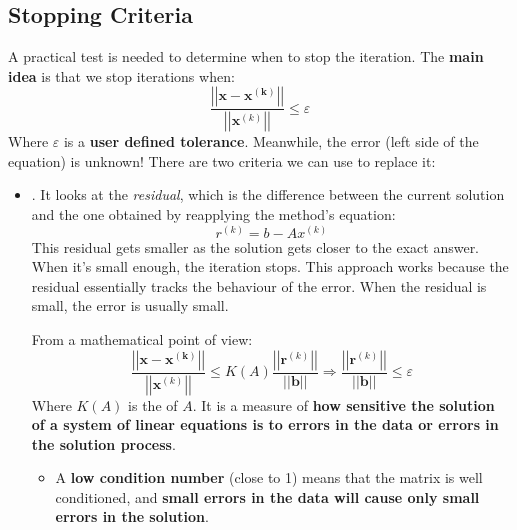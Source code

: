 \subsection{Stopping Criteria}

A practical test is needed to determine when to stop the iteration. The \textbf{main idea} is that we stop iterations when:
\begin{equation*}
    \dfrac{\left|\left|\mathbf{x} - \mathbf{x^{\left(k\right)}}\right|\right|}{\left|\left|\mathbf{x}^{\left(k\right)}\right|\right|} \le \varepsilon
\end{equation*}
Where $\varepsilon$ is a \textbf{user defined tolerance}. Meanwhile, the error (left side of the equation) is unknown! There are two criteria we can use to replace it:
\begin{itemize}
    \item {}. It looks at the \emph{residual}, which is the difference between the current solution and the one obtained by reapplying the method's equation:
    \begin{equation*}
        r^{\left(k\right)} = b - Ax^{\left(k\right)}
    \end{equation*}
    This residual gets smaller as the solution gets closer to the exact answer. When it's small enough, the iteration stops. This approach works because the residual essentially tracks the behaviour of the error. When the residual is small, the error is usually small.
    
    From a mathematical point of view:
    \begin{equation*}
        \dfrac{\left|\left|\mathbf{x} - \mathbf{x^{\left(k\right)}}\right|\right|}{\left|\left|\mathbf{x}^{\left(k\right)}\right|\right|} \le K\left(A\right) \dfrac{\left|\left|\mathbf{r}^{\left(k\right)}\right|\right|}{\left|\left|\mathbf{b}\right|\right|} \Longrightarrow \dfrac{\left|\left|\mathbf{r}^{\left(k\right)}\right|\right|}{\left|\left|\mathbf{b}\right|\right|} \le \varepsilon
    \end{equation*}
    Where $K\left(A\right)$ is the  of $A$. It is a measure of \textbf{how sensitive the solution of a system of linear equations is to errors in the data or errors in the solution process}.
    \begin{itemize}
        \item A \textbf{low condition number} (close to 1) means that the matrix is well conditioned, and \textbf{small errors in the data will cause only small errors in the solution}.


\end{itemize}
\end{itemize}
